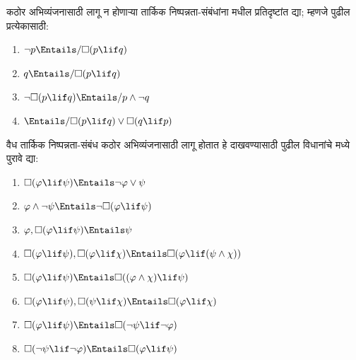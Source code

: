 \begin{prob}
  कठोर अभिव्यंजनासाठी लागू न होणाऱ्या
  तार्किक निष्पन्नता-संबंधांना
   मधील प्रतिदृष्टांत द्या;
  म्हणजे पुढील प्रत्येकासाठी:
  \begin{enumerate}
  \item $\lnot p \Entails/ \Box(p \lif q)$
  \item $q \Entails/ \Box(p \lif q)$
  \item $\lnot\Box(p \lif q) \Entails/ p \land \lnot q$
  \item $\Entails/ \Box(p \lif q) \lor \Box(q \lif p)$
  \end{enumerate}
\end{prob}

\begin{prob}
  वैध तार्किक निष्पन्नता-संबंध
  कठोर अभिव्यंजनासाठी लागू होतात
  हे दाखवण्यासाठी पुढील
  विधानांचे  मध्ये
  पुरावे द्या:
  \begin{enumerate}
  \item  $\Box(\varphi \lif \psi) \Entails \lnot \varphi \lor \psi$
  \item $\varphi \land \lnot \psi \Entails \lnot\Box(\varphi \lif \psi)$
  \item $\varphi, \Box(\varphi \lif \psi) \Entails \psi$
  \item $\Box(\varphi \lif \psi), \Box(\varphi \lif \chi) \Entails \Box(\varphi \lif (\psi
    \land \chi))$
  \item $\Box(\varphi \lif \psi) \Entails \Box((\varphi \land \chi) \lif \psi)$
  \item $\Box(\varphi \lif \psi), \Box(\psi \lif \chi) \Entails \Box(\varphi
    \lif \chi)$
  \item $\Box(\varphi \lif \psi) \Entails \Box(\lnot \psi \lif \lnot \varphi)$
  \item $\Box(\lnot \psi \lif \lnot \varphi) \Entails \Box(\varphi \lif \psi)$
  \end{enumerate}
  \end{prob}

